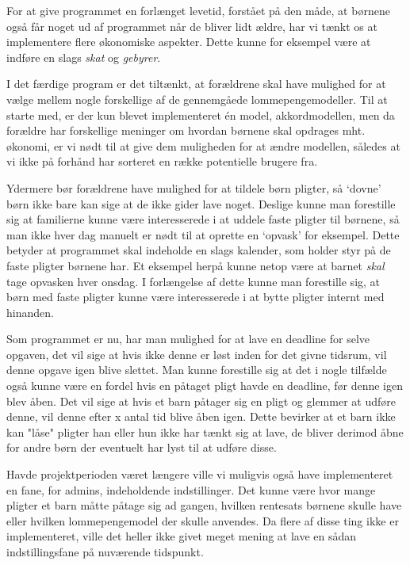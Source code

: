 For at give programmet en forlænget levetid, forstået på den måde, at børnene også får noget ud af programmet når de bliver lidt ældre, har vi tænkt os at implementere flere økonomiske aspekter. Dette kunne for eksempel være at indføre en slags \textit{skat} og \textit{gebyrer}.

I det færdige program er det tiltænkt, at forældrene skal have mulighed for at vælge mellem nogle forskellige af de gennemgåede lommepengemodeller. Til at starte med, er der kun blevet implementeret én model, akkordmodellen, men da forældre har forskellige meninger om hvordan børnene skal opdrages mht. økonomi, er vi nødt til at give dem muligheden for at ændre modellen, således at vi ikke på forhånd har sorteret en række potentielle brugere fra.

Ydermere bør forældrene have mulighed for at tildele børn pligter, så ‘dovne’ børn ikke bare kan sige at de ikke gider lave noget. Deslige kunne man forestille sig at familierne kunne være interesserede i at uddele faste pligter til børnene, så man ikke hver dag manuelt er nødt til at oprette en ‘opvask’ for eksempel. Dette betyder at programmet skal indeholde en slags kalender, som holder styr på de faste pligter børnene har. Et eksempel herpå kunne netop være at barnet \textit{skal} tage opvasken hver onsdag. I forlængelse af dette kunne man forestille sig, at børn med faste pligter kunne være interesserede i at bytte pligter internt med hinanden.

Som programmet er nu, har man mulighed for at lave en deadline for selve opgaven, det vil sige at hvis ikke denne er løst inden for det givne tidsrum, vil denne opgave igen blive slettet. Man kunne forestille sig at det i nogle tilfælde også kunne være en fordel hvis en påtaget pligt havde en deadline, før denne igen blev åben. Det vil sige at hvis et barn påtager sig en pligt og glemmer at udføre denne, vil denne efter x antal tid blive åben igen. Dette bevirker at et barn ikke kan "låse" pligter han eller hun ikke har tænkt sig at lave, de bliver derimod åbne for andre børn der eventuelt har lyst til at udføre disse.

Havde projektperioden været længere ville vi muligvis også have implementeret en fane, for admins, indeholdende indstillinger. Det kunne være hvor mange pligter et barn måtte påtage sig ad gangen, hvilken rentesats børnene skulle have eller hvilken lommepengemodel der skulle anvendes. Da flere af disse ting ikke er implementeret, ville det heller ikke givet meget mening at lave en sådan indstillingsfane på nuværende tidspunkt.
